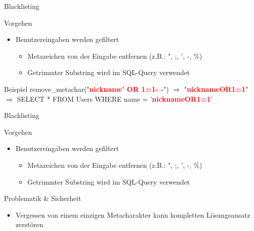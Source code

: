\begin{frame}{Blacklisting}
\begin{block}{Vorgehen}
\begin{itemize}
\item Benutzereingaben werden gefiltert
	\begin{itemize}
	\item Metazeichen von der Eingabe entfernen (z.B.: ", ;, ', -, \%)
	\item Getrimmter Substring wird im SQL-Query verwendet
	\end{itemize}
\end{itemize}
\end{block}
\begin{block}{Beispiel}	
	remove\_metachar("{}\textcolor{red}{\textbf{nickname'{} OR 1=1- -}}{}") $\Rightarrow$ "{}\textcolor{red}{\textbf{nicknameOR1=1}}{}" \\
	$\Rightarrow$ SELECT * FROM Users WHERE name = '{}\textcolor{red}{\textbf{nicknameOR1=1}}'{}

\end{block}
\end{frame}

\begin{frame}{Blacklisting}
\begin{block}{Vorgehen}
\begin{itemize}
\item Benutzereingaben werden gefiltert
	\begin{itemize}
	\item Metazeichen von der Eingabe entfernen (z.B.: ", ;, ', -, \%)
	\item Getrimmter Substring wird im SQL-Query verwendet
	\end{itemize}
\end{itemize}
\end{block}
\begin{block}{Problematik \& Sicherheit}	
\begin{itemize}
\item Vergessen von einem einzigen Metacharakter kann kompletten Lösungsansatz zerstören
\end{itemize}
\end{block}
\end{frame}


